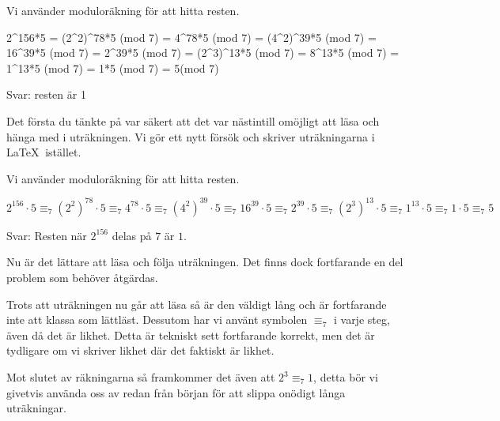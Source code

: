 \documentclass[titlepage]{article}
\begin{document}
\begin{center}
\begin{tcolorbox}[width=\linewidth,colback={red!15!white},title={\textbf{Lösning 1 - Sämre}},outer arc=0mm,colupper=black]
    Vi använder moduloräkning för att hitta resten.

    2\textasciicircum{156}*5 = (2\textasciicircum2)\textasciicircum 78*5 (mod 7) = 4\textasciicircum78*5 (mod 7) = (4\textasciicircum2)\textasciicircum39*5 (mod 7) = 16\textasciicircum39*5 (mod 7) = 2\textasciicircum39*5 (mod 7) = (2\textasciicircum3)\textasciicircum13*5 (mod 7) = 8\textasciicircum13*5 (mod 7) = 1\textasciicircum13*5 (mod 7) = 1*5 (mod 7) = 5(mod 7)

    Svar: resten är 1
\end{tcolorbox} 
\end{center}

Det första du tänkte på var säkert att det var nästintill omöjligt att läsa och hänga med i uträkningen. Vi gör ett nytt försök och skriver uträkningarna i \LaTeX$\:$ istället.

\begin{center}
\begin{tcolorbox}[width=\linewidth,colback={red!15!white},title={\textbf{Lösning 2 - Något bättre}},outer arc=0mm,colupper=black]
    Vi använder moduloräkning för att hitta resten.

    $2^{156}\cdot 5 \equiv_7 (2^2)^{78}\cdot 5\equiv_7 4^{78} \cdot 5 \equiv_7 (4^2)^{39} \cdot 5 \equiv_7 16^{39} \cdot 5 \equiv_7 2^{39} \cdot 5 \equiv_7 (2^3)^{13} \cdot 5 \equiv_7 1^{13}\cdot 5 \equiv_7 1 \cdot 5 \equiv_7 5$

    Svar: Resten när $2^{156}$ delas på $7$ är $1$.
\end{tcolorbox} 
\end{center}

Nu är det lättare att läsa och följa uträkningen. Det finns dock fortfarande en del problem som behöver åtgärdas. 

Trots att uträkningen nu går att läsa så är den väldigt lång och är fortfarande inte att klassa som lättläst. Dessutom har vi använt symbolen $\equiv_7$ i varje steg, även då det är likhet. Detta är tekniskt sett fortfarande korrekt, men det är tydligare om vi skriver likhet där det faktiskt är likhet.

Mot slutet av räkningarna så framkommer det även att $2^3 \equiv_7 1$, detta bör vi givetvis använda oss av redan från början för att slippa onödigt långa uträkningar.
\end{document}
